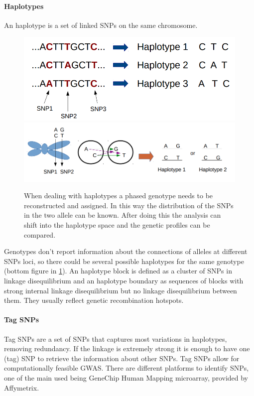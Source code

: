 			\paragraph{Haplotypes}
			An haplotype is a set of linked SNPs on the same chromosome.

			\begin{figure}[H]
				\centering
				\includegraphics[scale=0.3]{haplo}
				\includegraphics[scale=0.3]{haplo2}
				\caption{When dealing with haplotypes a phased genotype needs to be reconstructed and assigned. In this way the distribution of the SNPs in the two allele can be known. After doing this the analysis can shift into the haplotype space and the genetic profiles can be compared.}
				\label{fig:haplo}
				\end{figure}

			Genotypes don't report information about the connections of alleles at different SNPs loci, so there could be several possible haplotypes for the same genotype (bottom figure in \ref{fig:haplo}).
			An haplotype block is defined as a cluster of SNPs in linkage disequilibrium and an haplotype boundary as sequences of blocks with strong internal linkage disequilibrium but no linkage disequilibrium between them.
			They usually reflect genetic recombination hotspots.

			\paragraph{Tag SNPs}
			Tag SNPs are a set of SNPs that captures most variations in haplotypes, removing redundancy.
			If the linkage is extremely strong it is enough to have one (tag) SNP to retrieve the information about other SNPs.
			Tag SNPs allow for computationally feasible GWAS.
			There are different platforms to identify SNPs, one of the main used being GeneChip Human Mapping microarray, provided by Affymetrix.

